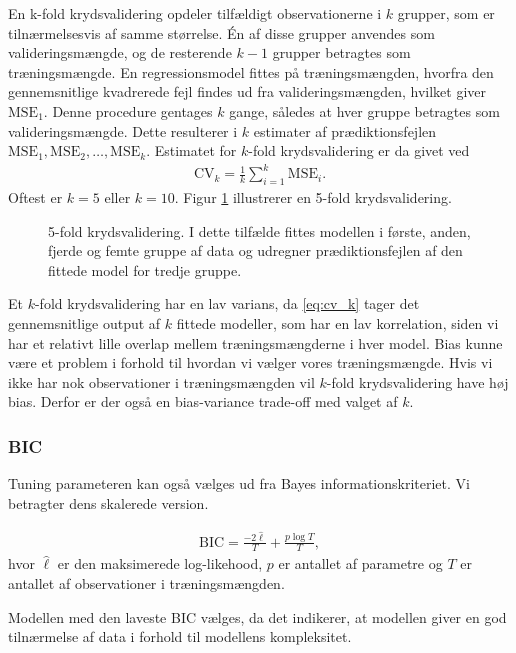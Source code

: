 En k-fold krydsvalidering opdeler tilfældigt observationerne i \(k\) grupper, som er tilnærmelsesvis af samme størrelse.
Én af disse grupper anvendes som valideringsmængde, og de resterende \(k-1\) grupper betragtes som træningsmængde.
En regressionsmodel fittes på træningsmængden, hvorfra den gennemsnitlige kvadrerede fejl findes ud fra valideringsmængden, hvilket giver \(\text{MSE}_1\).
Denne procedure gentages \(k\) gange, således at hver gruppe betragtes som valideringsmængde.
Dette resulterer i \(k\) estimater af prædiktionsfejlen $\text{MSE}_1, \text{MSE}_2, \dots , \text{MSE}_k$.
Estimatet for \(k\)-fold krydsvalidering er da givet ved
\begin{align}
\text{CV}_k = \frac{1}{k} \sum_{i=1}^k \text{MSE}_i. \label{eq:cv_k}
\end{align}
Oftest er $k=5$ eller $k = 10$. 
Figur \ref{fig:cv_teori} illustrerer en 5-fold krydsvalidering. 

\begin{figure}[H]
\center
\scalebox{0.6}{}
\caption{5-fold krydsvalidering. I dette tilfælde fittes modellen i første, anden, fjerde og femte gruppe af data og udregner prædiktionsfejlen af den fittede model for tredje gruppe.} \label{fig:cv_teori}
\end{figure} 

Et $k$-fold krydsvalidering har en lav varians, da \eqref{eq:cv_k} tager det gennemsnitlige output af $k$ fittede modeller, som har en lav korrelation, siden vi har et relativt lille overlap mellem træningsmængderne i hver model. 
Bias kunne være et problem i forhold til hvordan vi vælger vores træningsmængde. Hvis vi ikke har nok observationer i træningsmængden vil $k$-fold krydsvalidering have høj bias. Derfor er der også en bias-variance trade-off med valget af $k$. 
\newpage
\subsubsection{BIC}
Tuning parameteren kan også vælges ud fra Bayes informationskriteriet.
Vi betragter dens skalerede version.
%
\begin{defn} \label{def:bic}
\begin{align*}
\text{BIC} =  \frac{- 2 \widehat{\ell}}{T} + \frac{p \log T}{T}, 
\end{align*}
hvor \(\widehat{\ell}\) er den maksimerede log-likehood, \(p\) er antallet af parametre og \(T\) er antallet af observationer i træningsmængden.
\end{defn} 
%
Modellen med den laveste BIC vælges, da det indikerer, at modellen giver en god tilnærmelse af data i forhold til modellens kompleksitet. 

